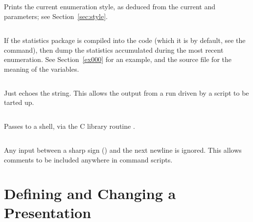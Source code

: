 \subsection{}
\label{cmd:style}

Prints the current enumeration style, as deduced from the current 
  and  parameters; see Section~\ref{sec:style}.

\subsection{}
\label{cmd:statistics}

If the statistics package is compiled into the code (which it is by
  default, see the  command), then dump the statistics
  accumulated during the most recent enumeration.
See Section~\ref{ex000} for an example, and the  source file
  for the meaning of the variables.

\subsection{}
\label{cmd:text}

Just echoes the string.
This allows the output from a run driven by a script to be tarted up.

\subsection{}
\label{cmd:system}

Passes  to a shell, via the C library routine .

\subsection{}
\label{cmd:hash}

Any input between a sharp sign (\ttt{\#}) and the next newline is ignored.
This allows comments to be included anywhere in command scripts.

\section{Defining and Changing a Presentation}
\label{sec:defpres}

\subsection{}
\label{cmd:add generators}

